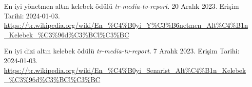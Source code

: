 \begin{thebibliography}{}
En iyi yönetmen altın kelebek ödülü \textit{tr-media-tv-report}. 20 Aralık 2023. Erişim Tarihi: 2024-01-03. \\
\url{https://tr.wikipedia.org/wiki/En_%C4%B0yi_Y%C3%B6netmen_Alt%C4%B1n_Kelebek_%C3%96d%C3%BCl%C3%BC}

En iyi dizi altın kelebek ödülü \textit{tr-media-tv-report}. 7 Aralık 2023. Erişim Tarihi: 2024-01-03. \\
\url{https://tr.wikipedia.org/wiki/En_%C4%B0yi_Senarist_Alt%C4%B1n_Kelebek_%C3%96d%C3%BCl%C3%BC}

\end{thebibliography}
\endgroup
